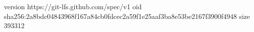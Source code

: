version https://git-lfs.github.com/spec/v1
oid sha256:2a8bdc04843968f167a84cb0fdcec2a59f1e25aaf3ba8e53be2167f3900f4948
size 393312
